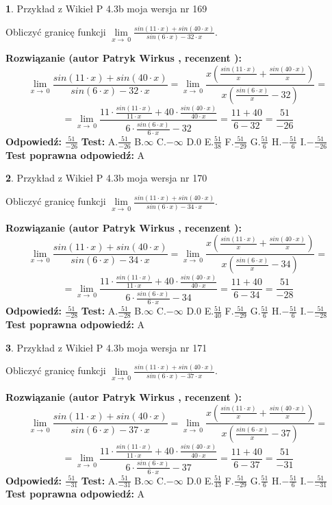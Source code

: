 \documentclass[12pt, a4paper]{article}
\theoremstyle{definition} %
\newtheorem{zad}{}
\newcommand{\zadStart}[1]{\begin{zad}#1\newline}
\newcommand{\zadStop}{\end{zad}}
\newcommand{\rozwStart}[2]{\noindent \textbf{Rozwiązanie (autor #1 , recenzent #2): }\newline}
\newcommand{\rozwStop}{\newline}
\newcommand{\odpStart}{\noindent \textbf{Odpowiedź:}\newline}
\newcommand{\odpStop}{\newline}
\newcommand{\testStart}{\noindent \textbf{Test:}\newline}
\newcommand{\testStop}{\newline}
\newcommand{\kluczStart}{\noindent \textbf{Test poprawna odpowiedź:}\newline}
\newcommand{\kluczStop}{\newline}
\begin{document}
\zadStart{Przykład z Wikieł P 4.3b moja wersja nr 169}


Obliczyć granicę funkcji $\lim\limits_{x\to\ 0}\frac{sin(11 \cdot x)+sin(40 \cdot x)}{sin(6 \cdot x)-32 \cdot x}$.
\zadStop
\rozwStart{Patryk Wirkus}{}
$$\lim\limits_{x\to\ 0}\frac{sin(11 \cdot x)+sin(40 \cdot x)}{sin(6 \cdot x)-32 \cdot x}=\lim\limits_{x\to\ 0}\frac{x(\frac{sin(11 \cdot x)}{x}+\frac{sin(40 \cdot x)}{x})}{x(\frac{sin(6 \cdot x)}{x}-32)}=$$
$$=\lim\limits_{x\to\ 0}\frac{11 \cdot \frac{sin(11 \cdot x)}{11 \cdot x}+40 \cdot \frac{sin(40 \cdot x)}{40 \cdot x}}{6 \cdot \frac{sin(6 \cdot x)}{6 \cdot x}-32}=\frac{11+40}{6-32} = \frac{51}{-26}$$
\rozwStop
\odpStart
$\frac{51}{-26}$
\odpStop
\testStart
A.$\frac{51}{-26}$
B.$\infty$
C.$-\infty$
D.$0$
E.$\frac{51}{38}$
F.$\frac{51}{-29}$
G.$\frac{51}{6}$
H.$-\frac{51}{6}$
I.$-\frac{51}{-26}$
\testStop
\kluczStart
A
\kluczStop



\zadStart{Przykład z Wikieł P 4.3b moja wersja nr 170}


Obliczyć granicę funkcji $\lim\limits_{x\to\ 0}\frac{sin(11 \cdot x)+sin(40 \cdot x)}{sin(6 \cdot x)-34 \cdot x}$.
\zadStop
\rozwStart{Patryk Wirkus}{}
$$\lim\limits_{x\to\ 0}\frac{sin(11 \cdot x)+sin(40 \cdot x)}{sin(6 \cdot x)-34 \cdot x}=\lim\limits_{x\to\ 0}\frac{x(\frac{sin(11 \cdot x)}{x}+\frac{sin(40 \cdot x)}{x})}{x(\frac{sin(6 \cdot x)}{x}-34)}=$$
$$=\lim\limits_{x\to\ 0}\frac{11 \cdot \frac{sin(11 \cdot x)}{11 \cdot x}+40 \cdot \frac{sin(40 \cdot x)}{40 \cdot x}}{6 \cdot \frac{sin(6 \cdot x)}{6 \cdot x}-34}=\frac{11+40}{6-34} = \frac{51}{-28}$$
\rozwStop
\odpStart
$\frac{51}{-28}$
\odpStop
\testStart
A.$\frac{51}{-28}$
B.$\infty$
C.$-\infty$
D.$0$
E.$\frac{51}{40}$
F.$\frac{51}{-29}$
G.$\frac{51}{6}$
H.$-\frac{51}{6}$
I.$-\frac{51}{-28}$
\testStop
\kluczStart
A
\kluczStop



\zadStart{Przykład z Wikieł P 4.3b moja wersja nr 171}


Obliczyć granicę funkcji $\lim\limits_{x\to\ 0}\frac{sin(11 \cdot x)+sin(40 \cdot x)}{sin(6 \cdot x)-37 \cdot x}$.
\zadStop
\rozwStart{Patryk Wirkus}{}
$$\lim\limits_{x\to\ 0}\frac{sin(11 \cdot x)+sin(40 \cdot x)}{sin(6 \cdot x)-37 \cdot x}=\lim\limits_{x\to\ 0}\frac{x(\frac{sin(11 \cdot x)}{x}+\frac{sin(40 \cdot x)}{x})}{x(\frac{sin(6 \cdot x)}{x}-37)}=$$
$$=\lim\limits_{x\to\ 0}\frac{11 \cdot \frac{sin(11 \cdot x)}{11 \cdot x}+40 \cdot \frac{sin(40 \cdot x)}{40 \cdot x}}{6 \cdot \frac{sin(6 \cdot x)}{6 \cdot x}-37}=\frac{11+40}{6-37} = \frac{51}{-31}$$
\rozwStop
\odpStart
$\frac{51}{-31}$
\odpStop
\testStart
A.$\frac{51}{-31}$
B.$\infty$
C.$-\infty$
D.$0$
E.$\frac{51}{43}$
F.$\frac{51}{-29}$
G.$\frac{51}{6}$
H.$-\frac{51}{6}$
I.$-\frac{51}{-31}$
\testStop
\kluczStart
A
\kluczStop
\end{document}
